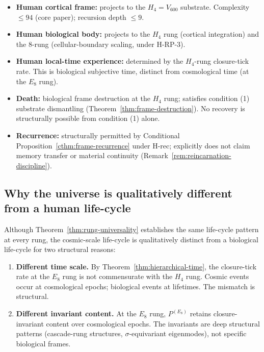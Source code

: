 \documentclass[11pt]{article}
\theoremstyle{plain}
\theoremstyle{definition}
\theoremstyle{remark}
\begin{document}
\begin{itemize}[leftmargin=2em]
\item \textbf{Human cortical frame:} projects to the $H_4 = V_{600}$ substrate. Complexity $\leq 94$ (core paper); recursion depth $\leq 9$.
\item \textbf{Human biological body:} projects to the $H_4$ rung (cortical integration) and the 8-rung (cellular-boundary scaling, under H-RP-3).
\item \textbf{Human local-time experience:} determined by the $H_4$-rung closure-tick rate. This is biological subjective time, distinct from cosmological time (at the $E_8$ rung).
\item \textbf{Death:} biological frame destruction at the $H_4$ rung; satisfies condition (1) substrate dismantling (Theorem~\ref{thm:frame-destruction}). No recovery is structurally possible from condition (1) alone.
\item \textbf{Recurrence:} structurally permitted by Conditional Proposition~\ref{cthm:frame-recurrence} under H-rec; explicitly does not claim memory transfer or material continuity (Remark~\ref{rem:reincarnation-discipline}).
\end{itemize}

\subsection{Why the universe is qualitatively different from a human life-cycle}

Although Theorem~\ref{thm:rung-universality} establishes the same life-cycle pattern at every rung, the cosmic-scale life-cycle is qualitatively distinct from a biological life-cycle for two structural reasons:

\begin{enumerate}[leftmargin=2em]
\item \textbf{Different time scale.} By Theorem~\ref{thm:hierarchical-time}, the closure-tick rate at the $E_8$ rung is not commensurate with the $H_4$ rung. Cosmic events occur at cosmological epochs; biological events at lifetimes. The mismatch is structural.
\item \textbf{Different invariant content.} At the $E_8$ rung, $P^{(E_8)}$ retains closure-invariant content over cosmological epochs. The invariants are deep structural patterns (cascade-rung structures, $\sigma$-equivariant eigenmodes), not specific biological frames.
\end{enumerate}
\end{document}
